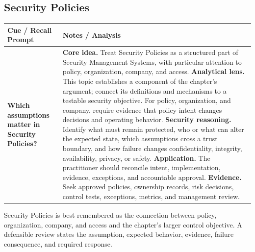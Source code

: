 \documentclass[11pt]{article}
\newcommand{\CornellHeader}{%
\rowcolor{Navy}\color{white}\bfseries Cue / Recall Prompt & \color{white}\bfseries Notes / Analysis\\\hline}
\newcommand{\CornellRow}[2]{%
\cellcolor{CueGray}\RaggedRight\textbf{#1} & \RaggedRight #2\\\hline}
\begin{document}
\subsection*{Security Policies}
\begin{longtable}{>{\RaggedRight\arraybackslash}p{}|>{\RaggedRight\arraybackslash}p{}}
\CornellHeader
\CornellRow{Which assumptions matter in Security Policies?}{\textbf{Core idea.} Treat Security Policies as a structured part of Security Management Systems, with particular attention to policy, organization, company, and access. \textbf{Analytical lens.} This topic establishes a component of the chapter's argument; connect its definitions and mechanisms to a testable security objective. For policy, organization, and company, require evidence that policy intent changes decisions and operating behavior. \textbf{Security reasoning.} Identify what must remain protected, who or what can alter the expected state, which assumptions cross a trust boundary, and how failure changes confidentiality, integrity, availability, privacy, or safety. \textbf{Application.} The practitioner should reconcile intent, implementation, evidence, exceptions, and accountable approval. \textbf{Evidence.} Seek approved policies, ownership records, risk decisions, control tests, exceptions, metrics, and management review.}
\end{longtable}
\begin{topicsummary}
Security Policies is best remembered as the connection between policy, organization, company, and access and the chapter's larger control objective. A defensible review states the assumption, expected behavior, evidence, failure consequence, and required response.
\end{topicsummary}
\end{document}
